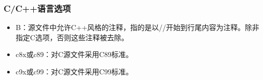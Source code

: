 \documentclass[a4paper,12pt,english]{sphinxmanual}
\begin{document}
\subsubsection{C/C++语言选项}
\label{\detokenize{compiler/pgi:c-c}}\label{\detokenize{compiler/pgi:cc-1}}\begin{itemize}
\item {} 
\sphinxAtStartPar
\sphinxhyphen{}B：源文件中允许C++风格的注释，指的是以//开始到行尾内容为注释。除非指定\sphinxhyphen{}C选项，否则这些注释被去除。

\item {} 
\sphinxAtStartPar
\sphinxhyphen{}c8x或\sphinxhyphen{}c89：对C源文件采用C89标准。

\item {} 
\sphinxAtStartPar
\sphinxhyphen{}c9x或\sphinxhyphen{}c99：对C源文件采用C99标准。

\end{itemize}
\end{document}
